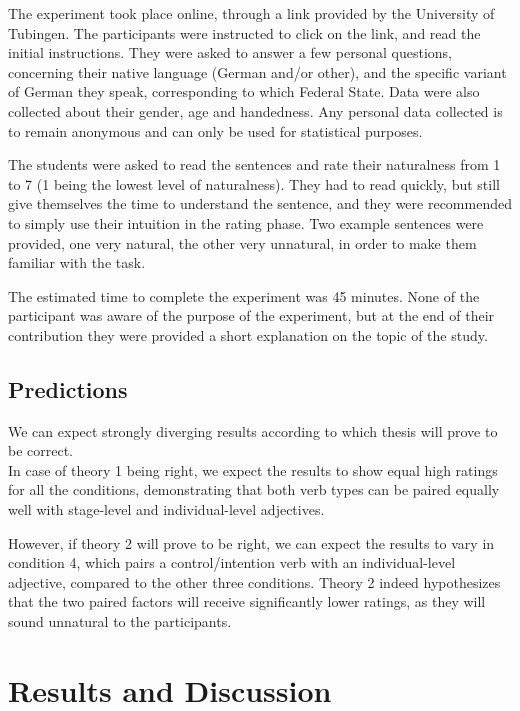 \documentclass[12pt,a4paper]{article}
\begin{document}
The experiment took place online, through a link provided by the University of Tubingen. The participants were instructed to click on the link, and read the initial instructions. They were asked to answer a few personal questions, concerning their native language (German and/or other), and the specific variant of German they speak, corresponding to which Federal State. Data were also collected about their gender, age and handedness. Any personal data collected is to remain anonymous and can only be used for statistical purposes.

The students were asked to read the sentences and rate their naturalness from 1 to 7 (1 being the lowest level of naturalness). They had to read quickly, but still give themselves the time to understand the sentence, and they were recommended to simply use their intuition in the rating phase.
Two example sentences were provided, one very natural, the other very unnatural, in order to make them familiar with the task.

The estimated time to complete the experiment was 45 minutes. None of the participant was aware of the purpose of the experiment, but at the end of their contribution they were provided a short explanation on the topic of the study.

\subsection{Predictions}

We can expect strongly diverging results according to which thesis will prove to be correct.\\

In case of theory 1 being right, we expect the results to show equal high ratings for all the conditions, demonstrating that both verb types can be paired equally well with stage-level and individual-level adjectives.

However, if theory 2 will prove to be right, we can expect the results to vary in condition 4, which pairs a control/intention verb with an individual-level adjective, compared to the other three conditions. Theory 2 indeed hypothesizes that the two paired factors will receive significantly lower ratings, as they will sound unnatural to the participants.

\section{Results and Discussion}
\end{document}
